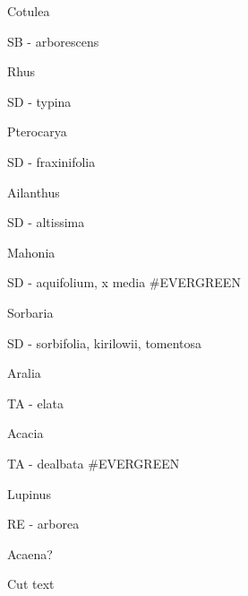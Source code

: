 \documentclass[openany]{book}
\begin{document}
Cotulea

SB - arborescens

Rhus

SD - typina

Pterocarya

SD - fraxinifolia

Ailanthus

SD - altissima

Mahonia

SD - aquifolium, x media \#EVERGREEN

Sorbaria

SD - sorbifolia, kirilowii, tomentosa

Aralia

TA - elata

Acacia

TA - dealbata \#EVERGREEN

Lupinus

RE - arborea

Acaena?

Cut text
\end{document}
